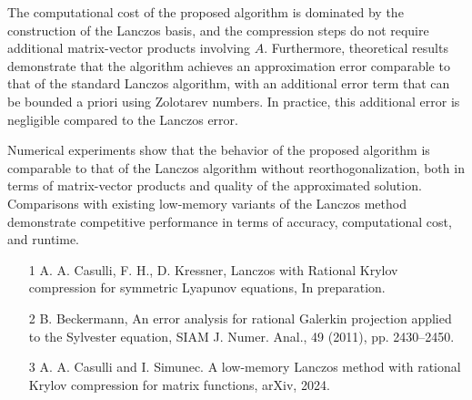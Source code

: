 \documentclass[ILAS2025-program.tex]{subfiles}
\begin{document}
\begin{ilasabstract}
The computational cost of the proposed algorithm is dominated by the construction of the Lanczos basis, and the compression steps do not require additional matrix-vector products involving $A$. Furthermore, theoretical results demonstrate that the algorithm achieves an approximation error comparable to that of the standard Lanczos algorithm, with an additional error term that can be bounded a priori using Zolotarev numbers. In practice, this additional error is negligible compared to the Lanczos error.

Numerical experiments show that the behavior of the proposed algorithm is comparable to that of the Lanczos algorithm without reorthogonalization, both in terms of matrix-vector products and quality of the approximated solution. Comparisons with existing low-memory variants of the Lanczos method demonstrate competitive performance in terms of accuracy, computational cost, and runtime.


\begin{itemize}
\item[1] A. A. Casulli, F. H., D. Kressner, Lanczos with Rational Krylov compression for symmetric Lyapunov equations, In preparation.
\item[2] B. Beckermann, An error analysis for rational Galerkin projection applied to the Sylvester
equation, SIAM J. Numer. Anal., 49 (2011), pp. 2430--2450. 
\item[3] A. A. Casulli and I. Simunec. A low-memory Lanczos method with rational
Krylov compression for matrix functions, arXiv, 2024.
\end{itemize} 

\end{ilasabstract}
    
\end{document}
